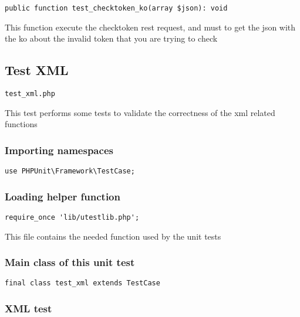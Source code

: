 \documentclass[a4paper]{article}
\begin{document}
\begin{lstlisting}
public function test_checktoken_ko(array $json): void
\end{lstlisting}

This function execute the checktoken rest request, and must to get the
json with the ko about the invalid token that you are trying to check

\hypertarget{toc424}{}
\subsection{Test XML}

\begin{lstlisting}
test_xml.php
\end{lstlisting}

This test performs some tests to validate the correctness
of the xml related functions

\hypertarget{toc425}{}
\subsubsection{Importing namespaces}

\begin{lstlisting}
use PHPUnit\Framework\TestCase;
\end{lstlisting}

\hypertarget{toc426}{}
\subsubsection{Loading helper function}

\begin{lstlisting}
require_once 'lib/utestlib.php';
\end{lstlisting}

This file contains the needed function used by the unit tests

\hypertarget{toc427}{}
\subsubsection{Main class of this unit test}

\begin{lstlisting}
final class test_xml extends TestCase
\end{lstlisting}

\hypertarget{toc428}{}
\subsubsection{XML test}
\end{document}
